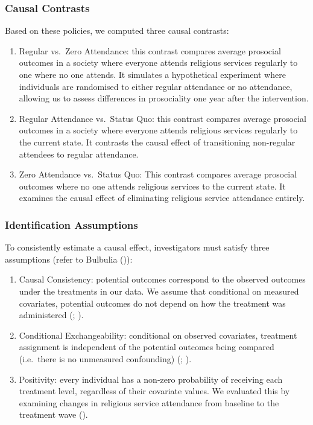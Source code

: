 \documentclass[
  single column]{article}
\providecommand{\tightlist}{%
  \setlength{\itemsep}{0pt}\setlength{\parskip}{0pt}}\usepackage{longtable,booktabs,array}
\begin{document}
\subsubsection{Causal Contrasts}\label{causal-contrasts}

Based on these policies, we computed three causal contrasts:

\begin{enumerate}
\def\labelenumi{\arabic{enumi}.}
\tightlist
\item
  Regular vs.~Zero Attendance: this contrast compares average prosocial
  outcomes in a society where everyone attends religious services
  regularly to one where no one attends. It simulates a hypothetical
  experiment where individuals are randomised to either regular
  attendance or no attendance, allowing us to assess differences in
  prosociality one year after the intervention.
\item
  Regular Attendance vs.~Status Quo: this contrast compares average
  prosocial outcomes in a society where everyone attends religious
  services regularly to the current state. It contrasts the causal
  effect of transitioning non-regular attendees to regular attendance.
\item
  Zero Attendance vs.~Status Quo: This contrast compares average
  prosocial outcomes where no one attends religious services to the
  current state. It examines the causal effect of eliminating religious
  service attendance entirely.
\end{enumerate}

\subsubsection{Identification
Assumptions}\label{identification-assumptions}

To consistently estimate a causal effect, investigators must satisfy
three assumptions (refer to Bulbulia
()):

\begin{enumerate}
\def\labelenumi{\arabic{enumi}.}
\item
  Causal Consistency: potential outcomes correspond to the observed
  outcomes under the treatments in our data. We assume that conditional
  on measured covariates, potential outcomes do not depend on how the
  treatment was administered (; ).
\item
  Conditional Exchangeability: conditional on observed covariates,
  treatment assignment is independent of the potential outcomes being
  compared (i.e.~there is no unmeasured confounding)
  (;
  ).
\item
  Positivity: every individual has a non-zero probability of receiving
  each treatment level, regardless of their covariate values. We
  evaluated this by examining changes in religious service attendance
  from baseline to the treatment wave
  ().
\end{enumerate}
\end{document}
